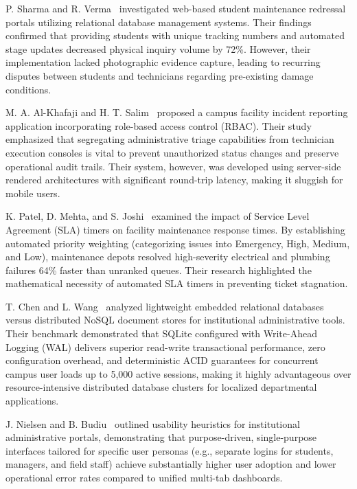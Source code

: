 \documentclass[10pt]{report}
\begin{document}
P. Sharma and R. Verma~\cite{sharma2021} investigated web-based student maintenance redressal portals utilizing relational database management systems. Their findings confirmed that providing students with unique tracking numbers and automated stage updates decreased physical inquiry volume by 72\%. However, their implementation lacked photographic evidence capture, leading to recurring disputes between students and technicians regarding pre-existing damage conditions.

M. A. Al-Khafaji and H. T. Salim~\cite{alkhafaji2020} proposed a campus facility incident reporting application incorporating role-based access control (RBAC). Their study emphasized that segregating administrative triage capabilities from technician execution consoles is vital to prevent unauthorized status changes and preserve operational audit trails. Their system, however, was developed using server-side rendered architectures with significant round-trip latency, making it sluggish for mobile users.

K. Patel, D. Mehta, and S. Joshi~\cite{patel2022} examined the impact of Service Level Agreement (SLA) timers on facility maintenance response times. By establishing automated priority weighting (categorizing issues into Emergency, High, Medium, and Low), maintenance depots resolved high-severity electrical and plumbing failures 64\% faster than unranked queues. Their research highlighted the mathematical necessity of automated SLA timers in preventing ticket stagnation.

T. Chen and L. Wang~\cite{chen2023} analyzed lightweight embedded relational databases versus distributed NoSQL document stores for institutional administrative tools. Their benchmark demonstrated that SQLite configured with Write-Ahead Logging (WAL) delivers superior read-write transactional performance, zero configuration overhead, and deterministic ACID guarantees for concurrent campus user loads up to 5,000 active sessions, making it highly advantageous over resource-intensive distributed database clusters for localized departmental applications.

J. Nielsen and B. Budiu~\cite{nielsen2022} outlined usability heuristics for institutional administrative portals, demonstrating that purpose-driven, single-purpose interfaces tailored for specific user personas (e.g., separate logins for students, managers, and field staff) achieve substantially higher user adoption and lower operational error rates compared to unified multi-tab dashboards.
\end{document}
